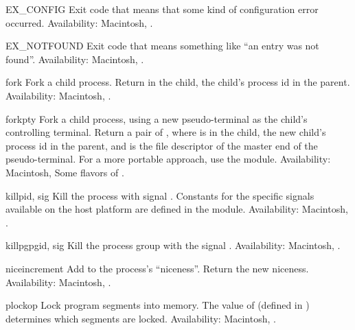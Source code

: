 \begin{datadesc}{EX_CONFIG}
Exit code that means that some kind of configuration error occurred.
Availability: Macintosh, \UNIX.
\end{datadesc}

\begin{datadesc}{EX_NOTFOUND}
Exit code that means something like ``an entry was not found''.
Availability: Macintosh, \UNIX.
\end{datadesc}

\begin{funcdesc}{fork}{}
Fork a child process.  Return  in the child, the child's
process id in the parent.
Availability: Macintosh, \UNIX.
\end{funcdesc}

\begin{funcdesc}{forkpty}{}
Fork a child process, using a new pseudo-terminal as the child's
controlling terminal. Return a pair of ,
where  is  in the child, the new child's process id
in the parent, and  is the file descriptor of the master end
of the pseudo-terminal.  For a more portable approach, use the
 module.
Availability: Macintosh, Some flavors of \UNIX.
\end{funcdesc}

\begin{funcdesc}{kill}{pid, sig}
Kill the process  with signal .  Constants for the
specific signals available on the host platform are defined in the
 module.
Availability: Macintosh, \UNIX.
\end{funcdesc}

\begin{funcdesc}{killpg}{pgid, sig}
Kill the process group  with the signal .
Availability: Macintosh, \UNIX.
\end{funcdesc}

\begin{funcdesc}{nice}{increment}
Add  to the process's ``niceness''.  Return the new
niceness.
Availability: Macintosh, \UNIX.
\end{funcdesc}

\begin{funcdesc}{plock}{op}
Lock program segments into memory.  The value of 
(defined in ) determines which segments are locked.
Availability: Macintosh, \UNIX.
\end{funcdesc}

